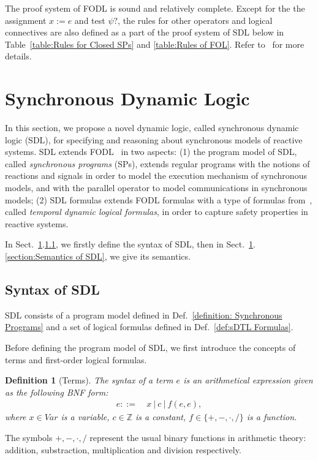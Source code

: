 \documentclass{fcs}
\newtheorem{mydef}{Definition}[section]
\newcommand{\mbb}[1]{\mathbb{#1}}
\newcommand{\Var}[0]{\mathit{Var}}
\newcommand{\ddef}[0]{::=}
\begin{document}
The proof system of FODL is sound and relatively complete. Except for the the assignment $x:=e$ and test $\psi?$, the rules for other operators and logical connectives are also defined as a part of the proof system of SDL below in Table~\ref{table:Rules for Closed SPs} and \ref{table:Rules of FOL}. Refer to~\cite{Harel00} for more details.


\section{Synchronous Dynamic Logic}
\label{section:Synchronous Dynamic Logic}
In this section, we propose a novel dynamic logic, called synchronous dynamic logic (SDL), for specifying and reasoning about synchronous models of reactive systems.
SDL extends FODL~\cite{Harel79} in two aspects: (1) the program model of SDL, called \emph{synchronous programs} (SPs), extends regular programs with the notions of reactions and signals in order to model the execution mechanism of synchronous models, and with the parallel operator to model communications in synchronous models; (2) SDL formulas extends FODL formulas with a type of formulas from~\cite{Platzer07}, called \emph{temporal dynamic logical formulas},  in order to capture safety properties in reactive systems.

In Sect.~\ref{section:Synchronous Dynamic Logic}.\ref{section:Syntax of SDL}, we firstly define the syntax of SDL,
then in Sect.~\ref{section:Synchronous Dynamic Logic}.\ref{section:Semantics of SDL}, we give its semantics.

\subsection{Syntax of SDL}
\label{section:Syntax of SDL}

SDL consists of a program model defined in Def.~\ref{definition: Synchronous Programs} and a set of logical formulas defined in Def.~\ref{def:sDTL Formulas}.

Before defining the program model of SDL, we first introduce the concepts of terms and first-order logical formulas.

\begin{mydef}[Terms]
\label{def:Terms}
	The syntax of a term $e$ is an arithmetical expression given as the following BNF form:
	$$\begin{aligned}
		e\ddef &\ x\ |\ c\ |\ f(e, e),
	\end{aligned}$$
	where $x\in \Var$ is a variable, $c\in \mbb{Z}$ is a constant, $f\in \{+, -, \cdot, /\}$ is a function.
\end{mydef}
The symbols $+,-,\cdot, /$ represent the usual binary functions in arithmetic theory: addition, substraction, multiplication and division respectively.
\end{document}
